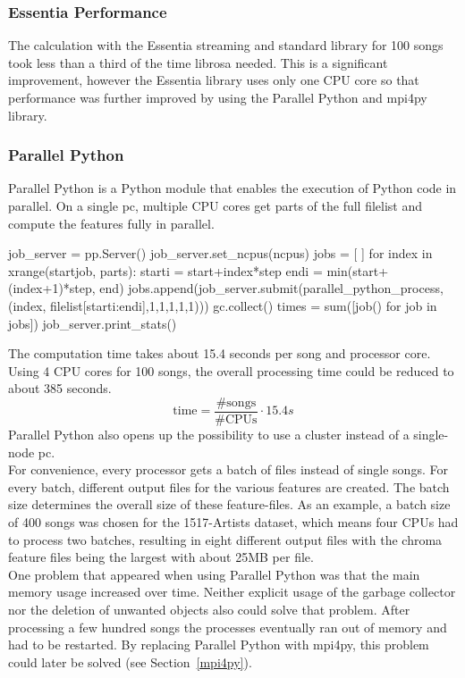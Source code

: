 \subsubsection{Essentia Performance}

The calculation with the Essentia streaming and standard library for 100 songs took less than a third of the time librosa needed. This is a significant improvement, however the Essentia library uses only one CPU core so that performance was further improved by using the Parallel Python and mpi4py library.

\subsubsection{Parallel Python}

Parallel Python is a Python module that enables the execution of Python code in parallel. On a single pc, multiple CPU cores get parts of the full filelist and compute the features fully in parallel.
\begin{pythonCode}[frame=single,label={lst:pp},caption={Parallel Python},captionpos=b]
job_server = pp.Server()
job_server.set_ncpus(ncpus)
jobs = [ ]
for index in xrange(startjob, parts):
	starti = start+index*step
	endi = min(start+(index+1)*step, end)
	jobs.append(job_server.submit(parallel_python_process, (index, filelist[starti:endi],1,1,1,1,1)))
	gc.collect()
times = sum([job() for job in jobs])
job_server.print_stats()
\end{pythonCode}
The computation time takes about 15.4 seconds per song and processor core. Using 4 CPU cores for 100 songs, the overall processing time could be reduced to about 385 seconds. 
\begin{equation} \label{eq:parallelp}
\text{time} = \frac{\#\text{songs}}{\#\text{CPUs}} \cdot 15.4s
\end{equation}
Parallel Python also opens up the possibility to use a cluster instead of a single-node pc.\\
For convenience, every processor gets a batch of files instead of single songs. For every batch, different output files for the various features are created. The batch size determines the overall size of these feature-files. As an example, a batch size of 400 songs was chosen for the 1517-Artists dataset, which means four CPUs had to process two batches, resulting in eight different output files with the chroma feature files being the largest with about 25MB per file.\\
One problem that appeared when using Parallel Python was that the main memory usage increased over time. Neither explicit usage of the garbage collector nor the deletion of unwanted objects also could solve that problem. After processing a few hundred songs the processes eventually ran out of memory and had to be restarted. By replacing Parallel Python with mpi4py, this problem could later be solved (see Section~\ref{mpi4py}). 

